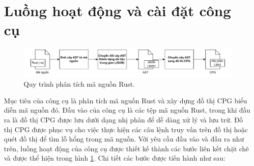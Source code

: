 \section{Luồng hoạt động và cài đặt công cụ}

\begin{figure}[H]
	\includegraphics[width=1\columnwidth]{figures/c3/c3_flow_2.drawio.pdf}
	\centering
	\caption{Quy trình phân tích mã nguồn Rust.}
	\label{img:c3_flow_2}
\end{figure}




Mục tiêu của công cụ là phân tích mã nguồn Rust và xây dựng đồ thị CPG biểu diễn mã nguồn đó.
Đầu vào của công cụ là các tệp mã nguồn Rust, trong khi đầu ra là đồ thị CPG được lưu dưới dạng nhị phân để dễ dàng xử lý và lưu trữ.
Đồ thị CPG được phục vụ cho việc thực hiện các câu lệnh truy vấn trên đồ thị hoặc quét đồ thị để tìm lỗ hổng trong mã nguồn.
Với yêu cầu đầu vào và đầu ra như trên, luồng hoạt động của công cụ được thiết kế thành các bước liên kết chặt chẽ và được thể hiện trong hình \ref{img:c3_flow_2}.
Chi tiết các bước được tiến hành như sau:

